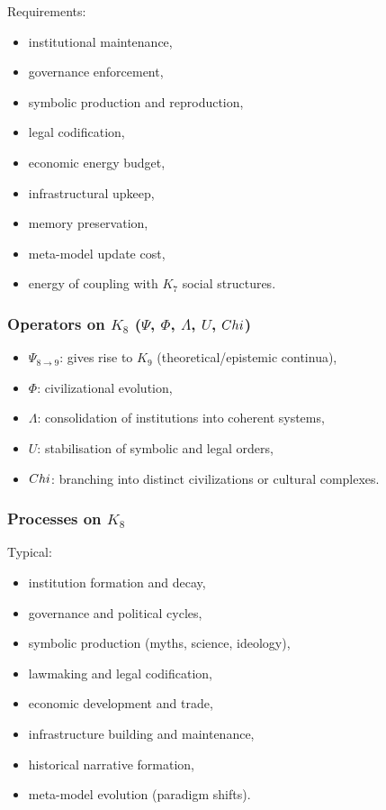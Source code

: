 Requirements:
\begin{itemize}
    \item institutional maintenance,
    \item governance enforcement,
    \item symbolic production and reproduction,
    \item legal codification,
    \item economic energy budget,
    \item infrastructural upkeep,
    \item memory preservation,
    \item meta-model update cost,
    \item energy of coupling with $K_7$ social structures.
\end{itemize}

\subsubsection{Operators on \texorpdfstring{$K_8$}{K_8} (\texorpdfstring{$\Psi$}{\Psi}, \texorpdfstring{$\Phi$}{\Phi}, \texorpdfstring{$\Lambda$}{\Lambda}, \texorpdfstring{$U$}{U}, \texorpdfstring{$Chi$}{\Chi})}

\begin{itemize}
    \item $\Psi_{8\to9}$: gives rise to $K_9$ (theoretical/epistemic continua),
    \item $\Phi$: civilizational evolution,
    \item $\Lambda$: consolidation of institutions into coherent systems,
    \item $U$: stabilisation of symbolic and legal orders,
    \item $Chi$: branching into distinct civilizations or cultural complexes.
\end{itemize}

\subsubsection{Processes on \texorpdfstring{$K_8$}{K_8}}

Typical:
\begin{itemize}
    \item institution formation and decay,
    \item governance and political cycles,
    \item symbolic production (myths, science, ideology),
    \item lawmaking and legal codification,
    \item economic development and trade,
    \item infrastructure building and maintenance,
    \item historical narrative formation,
    \item meta-model evolution (paradigm shifts).
\end{itemize}

